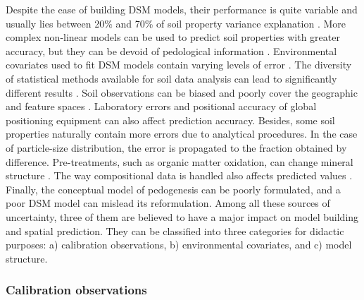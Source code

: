 Despite the ease of building DSM models, their performance is quite variable and
usually lies between 20\% and 70\% of soil property variance explanation 
\cite{MooreEtAl1993, OdehEtAl1994, GesslerEtAl1995, McKenzieEtAl1999, 
GobinEtAl2001, SumflethEtAl2008, SunEtAl2012}. More complex non-linear models 
can be used to predict soil properties with greater accuracy, but they can be 
devoid of pedological information \cite{Grunwald2009}. Environmental covariates 
used to fit DSM models contain varying levels of error \cite{HeuvelinkEtAl1989}.
The diversity of statistical methods available for soil data analysis can lead 
to significantly different results \cite{ParkEtAl2002}. Soil observations can be
biased and poorly cover the geographic and feature spaces \cite{HenglEtAl2003a, 
BrusEtAl2007a}. Laboratory errors and positional accuracy of global positioning 
equipment can also affect prediction accuracy. Besides, some soil properties 
naturally contain more errors due to analytical procedures. In the case of 
particle-size distribution, the error is propagated to the fraction obtained by 
difference. Pre-treatments, such as organic matter oxidation, can change 
mineral structure \cite{MikuttaEtAl2005a}. The way compositional data is handled
also affects predicted values \cite{LarkEtAl2007}. Finally, the conceptual 
model of pedogenesis can be poorly formulated, and a poor DSM model can mislead 
its reformulation. Among all these sources of uncertainty, three of them are 
believed to have a major impact on model building and spatial prediction. They 
can be classified into three categories for didactic purposes: a) calibration 
observations, b) environmental covariates, and c) model structure.

\subsubsection*{Calibration observations}

